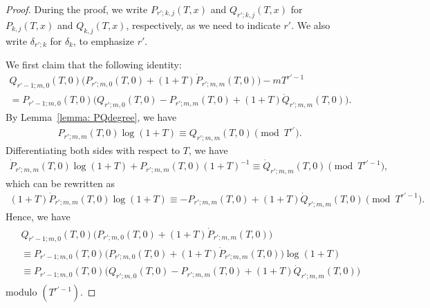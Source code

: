 \documentclass[11pt]{amsart}
\theoremstyle{definition}
\numberwithin{equation}{subsection}
\theoremstyle{plain}
\theoremstyle{plain}
\theoremstyle{plain}
\theoremstyle{plain}
\theoremstyle{plain}
\theoremstyle{plain}
\theoremstyle{plain}
\theoremstyle{plain}
\theoremstyle{plain}
\theoremstyle{plain}
\theoremstyle{plain}
\theoremstyle{plain}
\theoremstyle{definition}
\theoremstyle{definition}
\theoremstyle{definition}
\theoremstyle{remark}
\renewcommand{\(}{\textup{(}}
\renewcommand{\)}{\textup{)}}
\begin{document}
\begin{proof}
During the proof, we write $P_{r';k,j}(T,x)$ and $Q_{r';k,j}(T,x)$ for $P_{k,j}(T,x)$ and $Q_{k,j}(T,x)$, respectively, as we need to indicate $r'$. We also write $\delta_{r';k}$ for $\delta_k$, to emphasize $r'$.

We first claim that the following identity:
\begin{multline*}
Q_{r'-1;m,0}(T,0)\big(P_{r';m,0}(T,0)+(1+T)\dot{P}_{r';m,m}(T,0)\big)-mT^{r'-1}\\
=P_{r'-1;m,0}(T,0)\big(Q_{r';m,0}(T,0)-P_{r';m,m}(T,0)+(1+T)\dot{Q}_{r';m,m}(T,0)\big).
\end{multline*}
By Lemma~\ref{lemma: PQdegree}, we have
    \begin{align*}
        P_{r';m,m}(T,0)\log(1+T)\equiv Q_{r';m,m}(T,0) \pmod{T^{r'}}.
    \end{align*}
Differentiating both sides with respect to $T$, we have
    \begin{align*}
        \dot{P}_{r';m,m}(T,0)\log(1+T) +P_{r';m,m}(T,0)(1+T)^{-1} \equiv \dot{Q}_{r';m,m}(T,0) \pmod{T^{r'-1}},
    \end{align*}
which can be rewritten as
    \begin{align*}
        (1+T)\dot{P}_{r';m,m}(T,0)\log(1+T) \equiv -P_{r';m,m}(T,0)+(1+T)\dot{Q}_{r';m,m}(T,0) \pmod{T^{r'-1}}.
    \end{align*}
Hence, we have
    \begin{align}\label{eq: r=2m, P_m,m, 2}
    \begin{split}
        &Q_{r'-1;m,0}(T,0)\big(P_{r';m,0}(T,0)+(1+T)\dot{P}_{r';m,m}(T,0)\big)\\
        &\equiv
        P_{r'-1;m,0}(T,0)\big(P_{r';m,0}(T,0)+(1+T)\dot{P}_{r';m,m}(T,0)\big)\log(1+T)\\
        &\equiv
        P_{r'-1;m,0}(T,0)\big(
        Q_{r';m,0}(T,0)-P_{r';m,m}(T,0)+(1+T)\dot{Q}_{r';m,m}(T,0)\big)
    \end{split}
    \end{align}
modulo $(T^{r'-1})$.


\end{proof}
\end{document}
